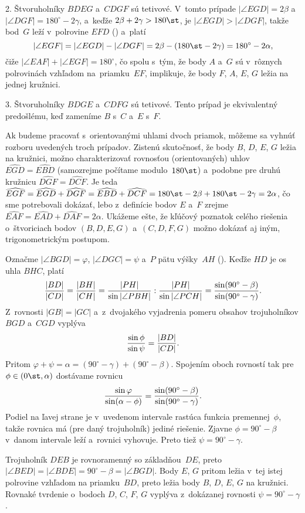 {2. Štvoruholníky $BDEG$ a~$CDGF$ sú tetivové.
V~tomto prípade $|\angle EGD| =2\beta$ a~$|\angle DGF|=180^\circ-2\gamma$,
a~keďže $2\beta+2\gamma>180\st$, je $|\angle EGD|>|\angle DGF|$, takže bod~$G$
leží v~polrovine $EFD$ () a~platí
$$
|\angle EGF| = |\angle EGD|-|\angle DGF| =2\beta-(180\st-2\gamma)= 180^\circ-2 \alpha,
$$
čiže $|\angle EAF|+|\angle EGF| = 180^\circ$, čo spolu s~tým, že body $A$ a~$G$ sú
v~rôznych polrovinách vzhľadom na~priamku~$EF$, implikuje, že body $F$,
$A$, $E$, $G$ ležia na jednej kružnici.

3. Štvoruholníky $BDGE$ a~$CDFG$ sú tetivové. Tento prípad je
ekvivalentný predošlému, keď zameníme $B$ s~$C$ a~$E$ s~$F$.

{\def\pi{180\st}
\poznamky
Ak budeme pracovať s~orientovanými uhlami dvoch priamok, môžeme
sa vyhnúť rozboru uvedených troch prípadov. Zistenú skutočnosť,
že body $B$, $D$, $E$, $G$ ležia na kružnici, možno charakterizovať
rovnosťou (orientovaných) uhlov $\widehat{EGD}=\widehat{EBD}$ (samozrejme
počítame modulo~$\pi$) a~podobne pre druhú kružnicu $\widehat{DGF}=\widehat{DCF}$.
Je teda $\widehat{EGF}=\widehat{EGD}+\widehat{DGF}=\widehat{EBD}+\widehat{DCF}=
\pi-2\beta+\pi-2\gamma=2\alpha$, čo sme potrebovali dokázať,
lebo z~definície bodov $E$ a~$F$ zrejme $\widehat{EAF}=\widehat{EAD}+\widehat{DAF}=2\alpha$.
}
\smallskip
Ukážeme ešte, že kľúčový poznatok celého riešenia o~štvoriciach bodov $(B,D,E,G)$
a~$(C,D,F,G)$ možno dokázať aj iným, trigonometrickým postupom.

Označme $|\angle BGD| = \varphi$, $|\angle DGC| = \psi$ a~$P$ pätu
výšky~$AH$ (\obr).
Keďže $HD$ je os uhla $BHC$, platí
$$
{|BD|\over |CD|} = {|BH|\over |CH|} = {|PH| \over \sin|\angle PBH|}: {|PH| \over
\sin |\angle PCH|} = {\sin (90^\circ-\beta) \over \sin (90^\circ-\gamma)}.
$$
Z~rovnosti $|GB|=|GC|$ a~z~dvojakého vyjadrenia pomeru obsahov
trojuholníkov $BGD$ a~$CGD$ vyplýva
$$
{\sin\phi \over \sin\psi} = {|BD| \over |CD|}.
$$
Pritom $\varphi+\psi = \alpha = (90^\circ-\gamma)+(90^\circ-\beta)$.
Spojením oboch rovností tak pre $\phi\in(0\st,\alpha)$ dostávame rovnicu
$$
{\sin \varphi \over \sin(\alpha- \phi)}={\sin (90^\circ-\beta) \over \sin (90^\circ-\gamma)}.
$$
Podiel na ľavej strane je v~uvedenom intervale rastúca funkcia premennej~$\phi$,
takže rovnica má (pre daný trojuholník) jediné riešenie.
Zjavne $\phi = 90^\circ-\beta$ v~danom intervale leží a~rovnici vyhovuje.
Preto tiež $\psi = 90^\circ-\gamma$.
%

Trojuholník $DEB$ je rovnoramenný so základňou~$DE$, preto $|\angle
BED| = |\angle BDE| = 90^\circ-\beta = |\angle BGD|$. Body $E$, $G$
pritom ležia v~tej istej polrovine vzhľadom na priamku~$BD$, preto ležia
body $B$, $D$, $E$, $G$ na kružnici. Rovnaké tvrdenie o~bodoch
$D$, $C$, $F$, $G$ vyplýva z~dokázanej rovnosti $\psi=90^\circ-\gamma$.

}
